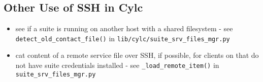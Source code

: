 \subsection{Other Use of SSH in Cylc}

\begin{itemize}
  \item see if a suite is running on another host with a shared
    filesystem - see \lstinline=detect_old_contact_file()= in
    \lstinline=lib/cylc/suite_srv_files_mgr.py=
  \item cat content of a remote service file over SSH, if possible, for
    clients on that do not have suite credentials installed - see
    \lstinline=_load_remote_item()= in \lstinline=suite_srv_files_mgr.py=
\end{itemize}
